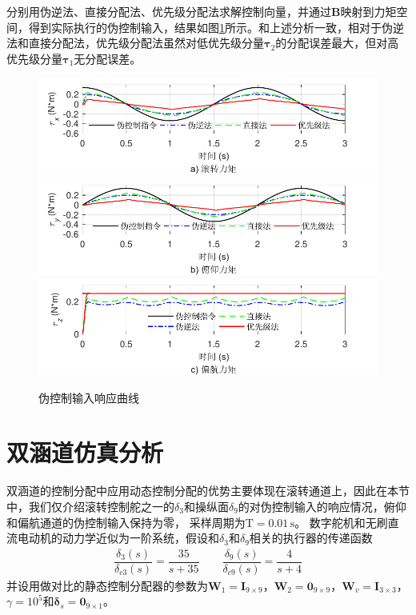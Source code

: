 分别用伪逆法、直接分配法、优先级分配法求解控制向量，并通过$\bm{B}$映射到力矩空间，得到实际执行的伪控制输入，结果如图\ref{fig_Virtual_control_response}所示。和上述分析一致，相对于伪逆法和直接分配法，优先级分配法虽然对低优先级分量$\bm{\tau}_2$的分配误差最大，但对高优先级分量$\bm{\tau}_1$无分配误差。
\begin{figure}[htbp]
	\centering	
	\includegraphics[scale=1]{Fig/Fig7a.pdf}
	\includegraphics[scale=1]{Fig/Fig7b.pdf}
	\includegraphics[scale=1]{Fig/Fig7c.pdf}
	\caption{\label{fig_Virtual_control_response}伪控制输入响应曲线}
\end{figure}

\section{双涵道仿真分析}
双涵道的控制分配中应用动态控制分配的优势主要体现在滚转通道上，因此在本节中，我们仅介绍滚转控制舵之一的$ \delta_3 $和操纵面$ \delta_9 $的对伪控制输入的响应情况，俯仰和偏航通道的伪控制输入保持为零， 采样周期为$\text{T}=0.01\,\text{s}$。 数字舵机和无刷直流电动机的动力学近似为一阶系统，假设和$ \delta_3 $和$ \delta_9 $相关的执行器的传递函数
\begin{align}
\dfrac{\delta_{ {3}}\left( s \right)}
{\delta_{c {3}}\left( s\right)}
=\dfrac{35}{s+35} \qquad
\dfrac{\delta_{ {9}}\left( s \right)}
{\delta_{c {9}}\left( s\right)}
=\dfrac{4}{s+4}
\end{align}
并设用做对比的静态控制分配器的参数为$ \bm{W}_1=\bm{I}_{9 \times 9}$，$\bm{W}_{2} = \bm{0}_{9 \times 9} $，$\bm{W}_v = \bm{I}_{3 \times 3}$，$ \gamma = 10^5 $和$ \bm{\delta}_s = \bm{0}_ {9 \times 1} $。 

